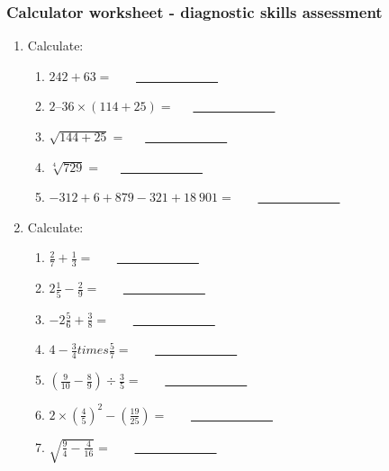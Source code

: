 \subsubsection{Calculator worksheet - diagnostic skills assessment}
\begin{enumerate}[itemsep=7pt, label=\textbf{\arabic*}. ] 
 \item Calculate:
\begin{enumerate}[itemsep=6pt,label=\textbf{(\alph*)}]
\item $ 242 + 63=$   ~~~\underline{~~~~~~~~~~~~~}
\item $2 – 36 \times (114 + 25)=$~~~\underline{~~~~~~~~~~~~~}
\item $\sqrt{144+25}=$~~~\underline{~~~~~~~~~~~~~}
\item $\sqrt[4]{729}=$~~~\underline{~~~~~~~~~~~~~}
\item $-312 + 6 + 879 -321 + 18~ 901=$ ~~~\underline{~~~~~~~~~~~~~}
\end{enumerate}

\item Calculate:
\begin{enumerate}[itemsep=6pt,label=\textbf{(\alph*)}]
\item $\frac{2}{7} + \frac{1}{3}=$  ~~~\underline{~~~~~~~~~~~~~}
\item $2\frac{1}{5} - \frac{2}{9}=$ ~~~\underline{~~~~~~~~~~~~~}
\item $-2\frac{5}{6} + \frac{3}{8}=$ ~~~\underline{~~~~~~~~~~~~~}
\item $ 4 - \frac{3}{4} times \frac{5}{7}=$ ~~~\underline{~~~~~~~~~~~~~}
\item $\left(\frac{9}{10} - \frac{8}{9}\right) \div \frac{3}{5}=$ ~~~\underline{~~~~~~~~~~~~~}
\item $2\times \left(\frac{4}{5}\right)^2 - \left(\frac{19}{25}\right)=$ ~~~\underline{~~~~~~~~~~~~~}
\item $\sqrt{\frac{9}{4} - \frac{4}{16}} =$ ~~~\underline{~~~~~~~~~~~~~}
\end{enumerate}
\end{enumerate}

